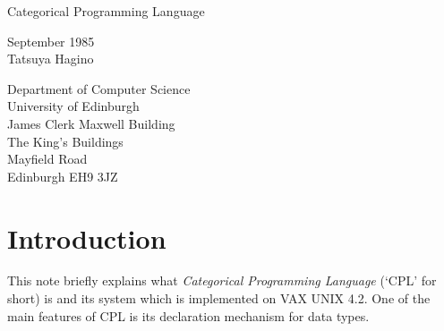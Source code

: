 \batchmode
{}
\addtolength{\textheight}{1.5in}
\addtolength{\textwidth}{1.5in}
\addtolength{\oddsidemargin}{-.5in}
\addtolength{\evensidemargin}{-.5in}

\begin{center}
\begin{LARGE}
Categorical Programming Language \\[1em]
\end{LARGE}
September 1985 \\[1em]
Tatsuya Hagino \\[1em]
\begin{small}
Department of Computer Science \\
University of Edinburgh \\
James Clerk Maxwell Building \\
The King's Buildings \\
Mayfield Road \\
Edinburgh EH9 3JZ
\end{small}
\end{center}

\section{Introduction}

This note briefly explains what {\it Categorical Programming Language}
(`CPL' for short) is and its system which is implemented on VAX UNIX 4.2.
One of the main features of CPL is its declaration mechanism for data types.

